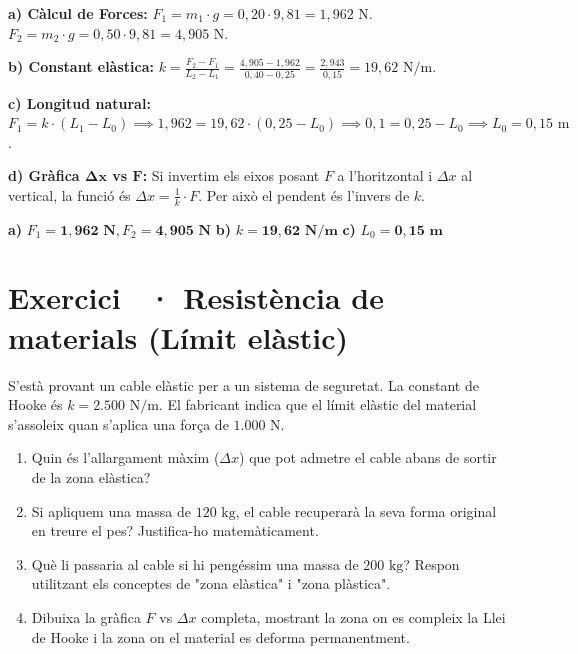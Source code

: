 \documentclass[12pt,a4paper,twoside]{article}
\newcounter{exercici}
\newcommand{\exercici}[1]{%
  \stepcounter{exercici}
  \section*{Exercici \theexercici\ \textnormal{· #1}}
  \vspace{-10pt}
}
\begin{document}
{\color{blue}
\textbf{a) Càlcul de Forces:}
$F_1 = m_1 \cdot g = 0{,}20 \cdot 9{,}81 = 1{,}962\text{ N}$.\\
$F_2 = m_2 \cdot g = 0{,}50 \cdot 9{,}81 = 4{,}905\text{ N}$.

\textbf{b) Constant elàstica:}
$k = \frac{F_2 - F_1}{L_2 - L_1} = \frac{4{,}905 - 1{,}962}{0{,}40 - 0{,}25} = \frac{2{,}943}{0{,}15} = 19{,}62\text{ N/m}$.

\textbf{c) Longitud natural:}
$F_1 = k \cdot (L_1 - L_0) \implies 1{,}962 = 19{,}62 \cdot (0{,}25 - L_0) \implies 0{,}1 = 0{,}25 - L_0 \implies L_0 = 0{,}15\text{ m}$.

\textbf{d) Gràfica $\mathbf{\Delta x}$ vs $\mathbf{F}$:}
Si invertim els eixos posant $F$ a l'horitzontal i $\Delta x$ al vertical, la funció és $\Delta x = \frac{1}{k} \cdot F$. Per això el pendent és l'invers de $k$.
\begin{center}
\end{center}

\begin{tcolorbox}[title=Respostes Finals,colframe=red!70!black,colback=red!5,sharp corners=south,fontupper=\color{blue}]
\textbf{a)} $F_1 = \mathbf{1{,}962\text{ N}}, F_2 = \mathbf{4{,}905\text{ N}}$ \quad \textbf{b)} $k = \mathbf{19{,}62\text{ N/m}}$ \quad \textbf{c)} $L_0 = \mathbf{0{,}15\text{ m}}$
\end{tcolorbox}
}

\vspace{0.5cm}
\exercici{Resistència de materials (Límit elàstic)}
S'està provant un cable elàstic per a un sistema de seguretat. La constant de Hooke és $k = 2.500\text{ N/m}$. El fabricant indica que el límit elàstic del material s'assoleix quan s'aplica una força de $1.000\text{ N}$.
\begin{enumerate}[label=\textbf{\alph*)}]
  \item Quin és l'allargament màxim ($\Delta x$) que pot admetre el cable abans de sortir de la zona elàstica?
  \item Si apliquem una massa de $120\text{ kg}$, el cable recuperarà la seva forma original en treure el pes? Justifica-ho matemàticament.
  \item Què li passaria al cable si hi pengéssim una massa de $200\text{ kg}$? Respon utilitzant els conceptes de "zona elàstica" i "zona plàstica".
  \item Dibuixa la gràfica $F$ vs $\Delta x$ completa, mostrant la zona on es compleix la Llei de Hooke i la zona on el material es deforma permanentment.
\end{enumerate}
\end{document}
